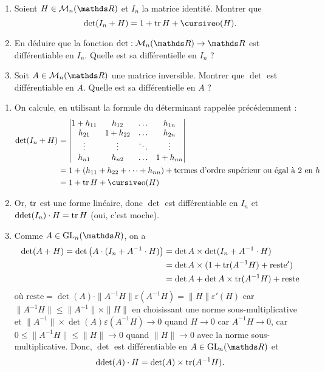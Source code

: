 \begin{exo}
	\begin{slshape}
		\begin{enumerate}
			\item Soient $H \in \mathcal{M}_n(\R)$ et $I_n$ la matrice identité. Montrer que \[
					\det(I_n + H) = 1 + \tr H + \po(H)
				.\]
			\item En déduire que la fonction $\det : \mathcal{M}_n(\R) \to \R$ est différentiable en $I_n$. Quelle est sa différentielle en $I_n$ ?
			\item Soit $A \in \mathcal{M}_n(\R)$ une matrice inversible. Montrer que $\det$ est différentiable en $A$. Quelle est sa différentielle en $A$ ?
		\end{enumerate}
	\end{slshape}

	\begin{enumerate}
		\item On calcule, en utilisant la formule du déterminant rappelée précédemment :
			\begin{align*}
				\det (I_n + H) &=
				\begin{vmatrix}
					1 + h_{11} & h_{12} & \ldots & h_{1n}\\
					h_{21} & 1 + h_{22} & \ldots & h_{2n}\\
					\vdots & \vdots & \ddots & \vdots\\
					h_{n1} & h_{n2} & \ldots & 1 + h_{nn}
				\end{vmatrix}\\
				&= 1 + (h_{11} + h_{22} + \cdots + h_{nn}) + \text{termes d'ordre supérieur ou égal à 2 en $h$}\\
				&= 1 + \tr H + \po(H) \\
			\end{align*}
		\item Or, $\operatorname{tr}$ est une forme linéaire, donc $\det$ est différentiable en $I_n$ et $\mathrm{d}\!\operatorname{det}(I_n) \cdot H = \operatorname{tr} H$ (oui, c'est moche).
		\item Comme $A \in \mathrm{GL}_n(\R)$, on a
			\begin{align*}
				\operatorname{det} (A + H) = \operatorname{det}\big(A \cdot (I_n + A^{-1} \cdot H)\big) &= \operatorname{det} A \times \operatorname{det}(I_n + A^{-1} \cdot H)\\
				&= \operatorname{det} A \times (1 + \operatorname{tr}(A^{-1}H) + \text{reste}') \\
				&= \operatorname{det} A + \operatorname{det} A \times \operatorname{tr}(A^{-1}H) + \text{reste} \\
			\end{align*}
			où $\text{reste} = \det(A) \cdot \|A^{-1}H\|\varepsilon(A^{-1}H) = \|H\|\varepsilon'(H)$ car $\|A^{-1}H\| \le \|A^{-1}\|\times \|H\|$ en choisissant une norme sous-multiplicative et $\|A^{-1}\| \times \det(A) \varepsilon(A^{-1}H)  \to 0$ quand $H\to 0$ car $A^{-1}H \to 0$, car $0\le \|A^{-1} H\| \le \|H\|\to 0$ quand $\|H\|\to 0$ avec la norme sous-multiplicative.
			Donc, $\det$ est différentiable en $A \in \mathrm{GL}_n(\R)$ et \[
				\mathrm{d}\!\operatorname{det}(A) \cdot H = \operatorname{det}(A) \times \operatorname{tr}(A^{-1}H)
			.\]
	\end{enumerate}
\end{exo}

